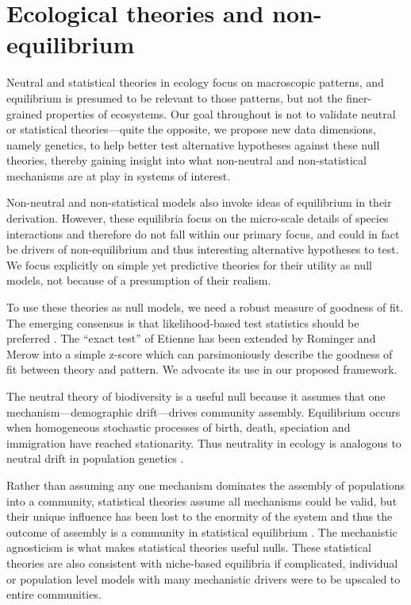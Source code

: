\documentclass[12pt]{article}
\begin{document}
\section{Ecological theories and non-equilibrium}

Neutral and statistical theories in ecology focus on macroscopic
patterns, and equilibrium is presumed to be relevant to those
patterns, but not the finer-grained properties of
ecosystems. Our goal throughout is not to validate neutral or statistical
theories---quite the opposite, we propose new data dimensions, namely
genetics, to help better test alternative hypotheses against these
null theories, thereby gaining insight into what non-neutral and
non-statistical mechanisms are at play in systems of interest.

Non-neutral and non-statistical models \citep[e.g.,][]{tilman2004,
  chesson2000} also invoke ideas of equilibrium in their
derivation. However, these equilibria focus on the micro-scale details
of species interactions and therefore do not fall within our primary
focus, and could in fact be drivers of non-equilibrium and thus
interesting alternative hypotheses to test.  We focus explicitly on
simple yet predictive theories for their utility as null models, not
because of a presumption of their realism.

To use these theories as null models, we need a robust measure of
goodness of fit. The emerging consensus is that likelihood-based test
statistics should be preferred \citep{baldridge2016}. The ``exact
test'' of Etienne \citep{etienne2007} has been extended by Rominger
and Merow \citep{meteR} into a simple z-score which can parsimoniously
describe the goodness of fit between theory and pattern.  We advocate
its use in our proposed framework.

The neutral theory of biodiversity \citep[NTB;][]{hubbell2001} is a
useful null because it assumes that one mechanism---demographic
drift---drives community assembly.  Equilibrium occurs when
homogeneous stochastic processes of birth, death, speciation and
immigration have reached stationarity. Thus neutrality in ecology is
analogous to neutral drift in population genetics \citep{hubbell2001}.

Rather than assuming any one mechanism dominates the assembly of
populations into a community, statistical theories assume all
mechanisms could be valid, but their unique influence has been lost to
the enormity of the system and thus the outcome of assembly is a
community in statistical equilibrium \citep{harte2011, pueyo2007}. The
mechanistic agnosticism is what makes statistical theories useful
nulls. These statistical theories are also consistent with niche-based
equilibria \citep{pueyo2007, neill2009} if complicated, individual or
population level models with many mechanistic drivers were to be
upscaled to entire communities. 
\end{document}

